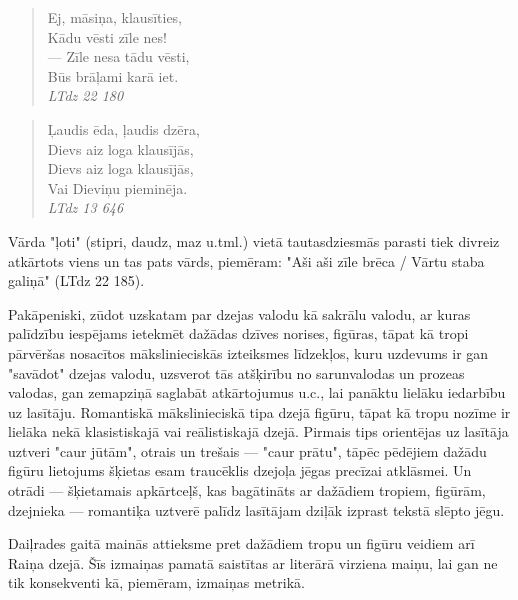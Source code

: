 \documentclass[11pt]{article}
\begin{document}
\begin{quote}
Ej, māsiņa, klausīties,\\
Kādu vēsti zīle nes!\\
--- Zīle nesa tādu vēsti,\\
Būs brāļami karā iet.\\
{\em LTdz 22 180}
\end{quote}

\begin{quote}
Ļaudis ēda, ļaudis dzēra,\\
Dievs aiz loga klausījās,\\
Dievs aiz loga klausījās,\\
Vai Dieviņu pieminēja.\\
{\em LTdz 13 646}
\end{quote}

Vārda "ļoti" (stipri, daudz, maz u.tml.)
vietā tautasdziesmās parasti tiek divreiz
atkārtots viens un tas pats vārds, piemēram:
"Aši aši zīle brēca / Vārtu staba galiņā"
(LTdz 22 185).

Pakāpeniski, zūdot uzskatam par dzejas
valodu kā sakrālu valodu, ar kuras palīdzību
iespējams ietekmēt dažādas dzīves
norises, figūras, tāpat kā tropi pārvēršas nosacītos
mākslinieciskās izteiksmes līdzekļos, kuru uzdevums ir
gan "savādot" dzejas valodu, uzsverot tās
atšķirību no sarunvalodas un prozeas valodas, gan
zemapziņā saglabāt atkārtojumus u.c., lai
panāktu lielāku iedarbību uz lasītāju. Romantiskā
mākslinieciskā tipa dzejā figūru, tāpat kā tropu nozīme
ir lielāka nekā klasistiskajā vai reālistiskajā dzejā.
Pirmais tips orientējas uz lasītāja uztveri
"caur jūtām", otrais un trešais ---
"caur prātu", tāpēc pēdējiem dažādu figūru
lietojums šķietas esam traucēklis dzejoļa jēgas precīzai atklāsmei.
Un otrādi --- šķietamais apkārtceļš, kas bagātināts
ar dažādiem tropiem, figūrām, dzejnieka --- romantiķa
uztverē palīdz lasītājam dziļāk izprast
tekstā slēpto jēgu.

Daiļrades gaitā mainās attieksme pret dažādiem
tropu un figūru veidiem arī Raiņa dzejā. Šīs
izmaiņas pamatā saistītas ar literārā virziena
maiņu, lai gan ne tik konsekventi kā, piemēram,
izmaiņas metrikā.
\end{document}

